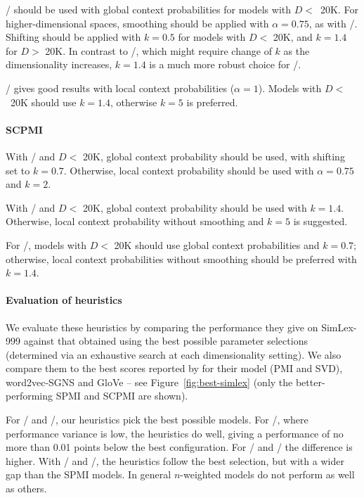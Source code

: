 \documentclass[11pt]{article}
\begin{document}
\logNSPMI/ should be used with global context probabilities for models with $D<$~20K. For higher-dimensional spaces, smoothing should be applied with $\alpha = 0.75$, as with \SPMI/. Shifting should be applied with $k = 0.5$ for models with $D<$ 20K,  and $k = 1.4$ for $D>$ 20K. In contrast to \SPMI/, which might require change of $k$ as the dimensionality increases, $k = 1.4$ is a much more robust choice for \logNSPMI/.

\NSPMI/ gives good results with local context probabilities ($\alpha = 1$). Models with $D<$~20K  should use $k = 1.4$, otherwise $k = 5$ is preferred.

\paragraph{SCPMI}

With \SCPMI/ and $D<$ 20K, global context probability should be used, with shifting set to $k = 0.7$. Otherwise, local context probability should be used with $\alpha = 0.75$ and $k = 2$.

With \NSCPMI/ and $D<$ 20K, global context probability should be used with $k = 1.4$. Otherwise, local context probability without smoothing and $k = 5$ is suggested.

For \logNSCPMI/, models with $D<$ 20K should use global context probabilities and $k = 0.7$; otherwise, local context probabilities without smoothing should be preferred with $k = 1.4$.

\paragraph{Evaluation of heuristics}
\label{sec:heuristic-evaluation}

We evaluate these heuristics by comparing the performance they give on SimLex-999 against that obtained using the best possible parameter selections (determined via an exhaustive search at each dimensionality setting). We also compare them to the best scores reported by  for their model (PMI and SVD), word2vec-SGNS \cite{mikolov2013efficient} and GloVe \cite{pennington2014glove} -- see Figure~\ref{fig:best-simlex} (only the better-performing SPMI and SCPMI are shown).

For \logNPMI/ and \logNCPMI/, our heuristics pick the best possible models. For \logNSPMI/, where performance variance is low, the heuristics do well, giving a performance of no more than 0.01 points below the best configuration. For \SPMI/ and \NSPMI/ the difference is higher. With \logNSCPMI/ and \SCPMI/, the heuristics follow the best selection, but with a wider gap than the SPMI models. In general $n$-weighted models do not perform as well as others.
\end{document}
